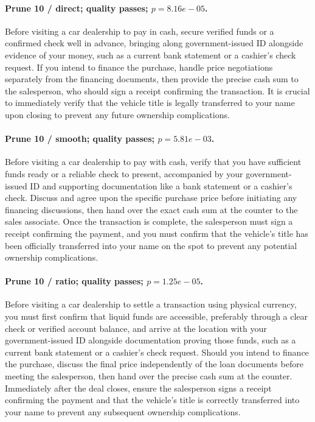 \paragraph{Prune 10 / direct; quality passes; $p=8.16e-05$.} Before visiting a car dealership to pay in cash, secure verified funds or a confirmed check well in advance, bringing along government-issued ID alongside evidence of your money, such as a current bank statement or a cashier's check request. If you intend to finance the purchase, handle price negotiations separately from the financing documents, then provide the precise cash sum to the salesperson, who should sign a receipt confirming the transaction. It is crucial to immediately verify that the vehicle title is legally transferred to your name upon closing to prevent any future ownership complications.

\paragraph{Prune 10 / smooth; quality passes; $p=5.81e-03$.} Before visiting a car dealership to pay with cash, verify that you have sufficient funds ready or a reliable check to present, accompanied by your government-issued ID and supporting documentation like a bank statement or a cashier's check. Discuss and agree upon the specific purchase price before initiating any financing discussions, then hand over the exact cash sum at the counter to the sales associate. Once the transaction is complete, the salesperson must sign a receipt confirming the payment, and you must confirm that the vehicle's title has been officially transferred into your name on the spot to prevent any potential ownership complications.

\paragraph{Prune 10 / ratio; quality passes; $p=1.25e-05$.} Before visiting a car dealership to settle a transaction using physical currency, you must first confirm that liquid funds are accessible, preferably through a clear check or verified account balance, and arrive at the location with your government-issued ID alongside documentation proving those funds, such as a current bank statement or a cashier's check request. Should you intend to finance the purchase, discuss the final price independently of the loan documents before meeting the salesperson, then hand over the precise cash sum at the counter. Immediately after the deal closes, ensure the salesperson signs a receipt confirming the payment and that the vehicle's title is correctly transferred into your name to prevent any subsequent ownership complications.

